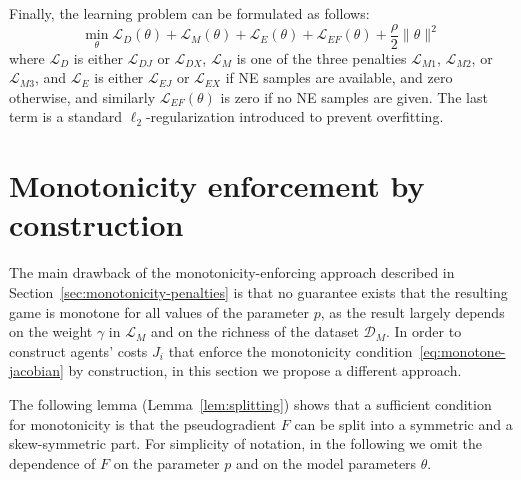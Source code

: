\documentclass[11pt, a4paper]{article}
\newcommand{\DD}{\mathcal{D}}
\newcommand{\LL}{\mathcal{L}}
\theoremstyle{remark}
\theoremstyle{plain}
\begin{document}
Finally, the learning problem can be formulated as follows:
\begin{equation}
\min_\theta \LL_{D}(\theta) + \LL_M(\theta) + \LL_{E}(\theta) + \LL_{EF}(\theta) + \frac{\rho}{2}\|\theta\|^2
\label{eq:learning-problem-point}
\end{equation}
where $\LL_D$ is either $\LL_{DJ}$ or $\LL_{DX}$, $\LL_M$ is one of the three penalties $\LL_{M1}$, $\LL_{M2}$, or $\LL_{M3}$, and $\LL_E$ is either $\LL_{EJ}$ or $\LL_{EX}$ if NE samples are available, and zero otherwise,
and similarly $\LL_{EF}(\theta)$ is zero if no NE samples are given. The last term is a standard $\ell_2$-regularization introduced to prevent overfitting.

\section{Monotonicity enforcement by construction}
\label{sec:monotone_parametrization}
The main drawback of the monotonicity-enforcing approach described in Section~\ref{sec:monotonicity-penalties} is that
no guarantee exists that the resulting game is monotone for all values of the parameter $p$, as the result largely
depends on the weight $\gamma$ in $\LL_M$ and on the richness of the dataset $\DD_M$. 
In order to construct agents' costs $J_i$ that enforce the monotonicity condition~\eqref{eq:monotone-jacobian} by construction, in this section we propose a different approach. 

The following lemma (Lemma~\ref{lem:splitting}) shows that a sufficient condition for monotonicity is that the pseudogradient $F$ can be split into a symmetric and a skew-symmetric part.
For simplicity of notation, in the following we omit the dependence of $F$ on the parameter $p$ and on the model parameters $\theta$.
\end{document}

